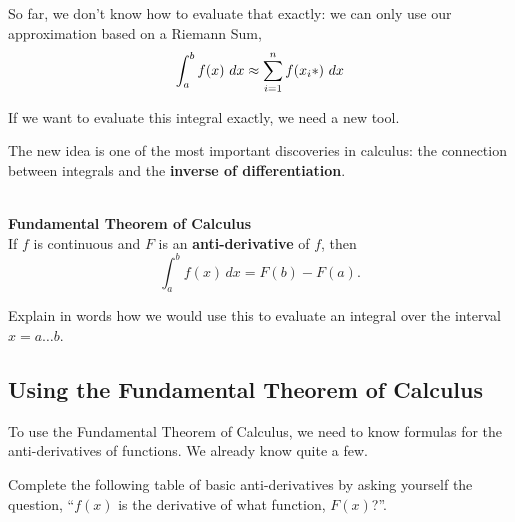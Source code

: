 So far, we don't know how to evaluate that exactly: we can only use our approximation
based on a Riemann Sum,
$$\displaystyle \int_a^b f(x)~dx \approx \sum_{i=1}^n f(x_i*) ~dx$$

If we want to evaluate this integral exactly, we need a new tool.

\newpage

The new idea is one of the most important discoveries in calculus: the
connection between integrals and the {\bf inverse of
  differentiation}. \\[1ex]

\begin{boxnote} ~\\ 
{\bf Fundamental Theorem of Calculus} \\

If $f$ is continuous and $F$ is an {\bf anti-derivative} of $f$, then 
\[ \int_a^b f(x)\,dx=F(b)-F(a).
\] 
\end{boxnote}

\problem Explain in words how we would use this to evaluate an
integral over the interval $x =a \ldots b$.

\vfill

\newpage

\subsection*{Using the Fundamental Theorem of Calculus}
To use the Fundamental Theorem of Calculus, we need to know formulas
for the anti-derivatives of functions.  We already know quite a few.

\newpage

\problem
Complete the following table of basic anti-derivatives by
asking yourself the question, ``$f(x)$ is the derivative of what
function, $F(x)$?''.

\begin{center}
\end{center}

